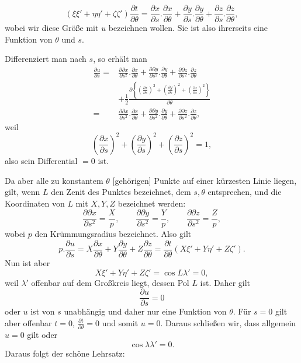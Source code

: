 %
\[
(\xi\xi'+\eta\eta'+\zeta\zeta')\frac{\partial t}{\partial\theta}=\frac{\partial x}{\partial s}.\frac{\partial x}{\partial\theta}+\frac{\partial y}{\partial s}.\frac{\partial y}{\partial\theta}+\frac{\partial z}{\partial s}.\frac{\partial z}{\partial\theta},
\]
wobei wir diese Größe mit $u$ bezeichnen wollen. Sie ist also ihrerseits eine Funktion von $\theta$ und $s$.

Differenziert man nach $s$, so erhält man
\[
\begin{aligned}
\frac{\partial u}{\partial s}={}&\frac{\partial\partial x}{\partial s^{2}}.\frac{\partial x}{\partial\theta}+\frac{\partial\partial y}{\partial s^{2}}.\frac{\partial y}{\partial\theta}+\frac{\partial\partial z}{\partial s^{2}}.\frac{\partial z}{\partial\theta}\\
&+\tfrac12\frac{\partial\left\{\left(\frac{\partial x}{\partial s}\right)^{2}+\left(\frac{\partial y}{\partial s}\right)^{2}+\left(\frac{\partial z}{\partial s}\right)^{2}\right\}}{\partial\theta}\\
={}&\frac{\partial\partial x}{\partial s^{2}}.\frac{\partial x}{\partial\theta}+\frac{\partial\partial y}{\partial s^{2}}.\frac{\partial y}{\partial\theta}+\frac{\partial\partial z}{\partial s^{2}}.\frac{\partial z}{\partial\theta},
\end{aligned}
\]
weil
\[
\left(\frac{\partial x}{\partial s}\right)^{2}+\left(\frac{\partial y}{\partial s}\right)^{2}+\left(\frac{\partial z}{\partial s}\right)^{2}=1,
\]
also sein Differential $=0$ ist.

Da aber alle zu konstantem $\theta$ [gehörigen] Punkte auf einer kürzesten Linie liegen, gilt, wenn $L$ den Zenit des Punktes bezeichnet, dem $s,\theta$ entsprechen, und die Koordinaten von $L$ mit $X,Y,Z$ bezeichnet werden:
\[
\frac{\partial\partial x}{\partial s^{2}}=\frac{X}{p},\qquad\frac{\partial\partial y}{\partial s^{2}}=\frac{Y}{p},\qquad\frac{\partial\partial z}{\partial s^{2}}=\frac{Z}{p},
\]
wobei $p$ den Krümmungsradius bezeichnet. Also gilt
\[
p.\frac{\partial u}{\partial s}=X\frac{\partial x}{\partial\theta}+Y\frac{\partial y}{\partial\theta}+Z\frac{\partial z}{\partial\theta}=\frac{\partial t}{\partial\theta}(X\xi'+Y\eta'+Z\zeta').
\]
Nun ist aber
\[
X\xi'+Y\eta'+Z\zeta'=\cos L\lambda'=0,
\]
weil $\lambda'$ offenbar auf dem Großkreis liegt, dessen Pol $L$ ist. Daher gilt
\[
\frac{\partial u}{\partial s}=0
\]
oder $u$ ist von $s$ unabhängig und daher nur eine Funktion von $\theta$. Für $s=0$ gilt aber offenbar $t=0$, $\frac{\partial t}{\partial\theta}=0$ und somit $u=0$. Daraus schließen wir, dass allgemein $u=0$ gilt oder
\[
\cos\lambda\lambda'=0.
\]
Daraus folgt der schöne Lehrsatz:
